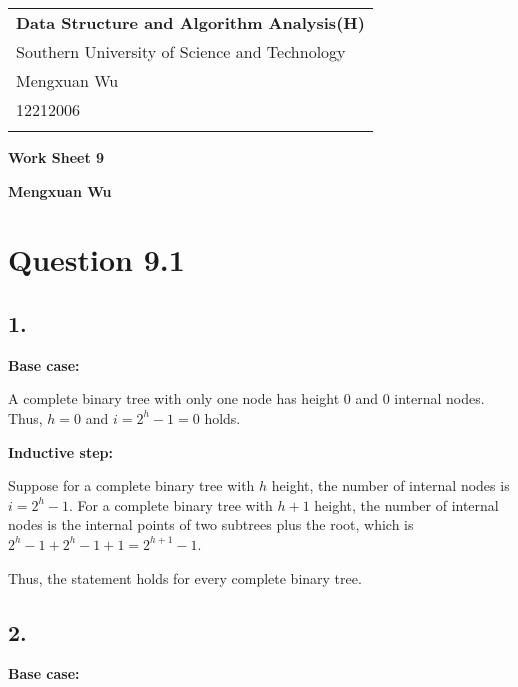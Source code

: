 \documentclass[a4paper,12pt]{article}
\begin{document}
\thispagestyle{empty} %

\begin{tabular}{p{15.5cm}}
{\large \bf Data Structure and Algorithm Analysis(H)} \\
Southern University of Science and Technology \\ Mengxuan Wu \\ 12212006 \\
\hline
\\
\end{tabular}

\vspace*{0.3cm} %

\begin{center}
	{\Large \bf Work Sheet 9}
	\vspace{2mm}

	{\bf Mengxuan Wu}
		
\end{center}  

\vspace{0.4cm}

\section*{Question 9.1}

\subsection*{1.}

\textbf{Base case:} 

A complete binary tree with only one node has height 0 and 0 internal nodes.
Thus, $h = 0$ and $i = 2^h - 1 = 0$ holds.

\textbf{Inductive step:}

Suppose for a complete binary tree with $h$ height, the number of internal nodes is $i = 2^h - 1$.
For a complete binary tree with $h + 1$ height, the number of internal nodes is the internal points of two subtrees plus the root, which is $2^h - 1 + 2^h - 1 + 1 = 2^{h+1} - 1$.

Thus, the statement holds for every complete binary tree.

\subsection*{2.}

\textbf{Base case:}
\end{document}
